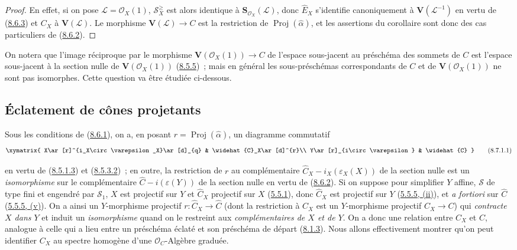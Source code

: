 \begin{proof}
En effet, si on pose $\mathcal{L}=\mathcal{O}_X(1)$,
$\mathcal{S}_X^{\geq}$ est alors identique à
$\mathbf{S}_{\mathcal{O}_X}(\mathcal{L})$, donc $\widehat{E}_X$ s'identifie
canoniquement à $\mathbf{V}(\mathcal{L}^{-1})$ en vertu de
(\hyperref[II.8.6.3-fr]{8.6.3}) et $C_X$ à $\mathbf{V}(\mathcal{L})$. Le
morphisme $\mathbf{V}(\mathcal{L})\to C$ est la restriction de
$\operatorname{Proj}(\widehat{\alpha})$, et les assertions du corollaire sont
donc des cas particuliers de (\hyperref[II.8.6.2-fr]{8.6.2}).
\end{proof}

On notera que l'image réciproque par le morphisme
$\mathbf{V}(\mathcal{O}_X(1))\to C$ de l'espace sous-jacent au préschéma des
sommets de $C$ est l'espace sous-jacent à la section nulle de
$\mathbf{V}(\mathcal{O}_X(1))$ (\hyperref[II.8.5.5-fr]{8.5.5})~; mais en
général les sous-préschémas correspondants de $C$ et de
$\mathbf{V}(\mathcal{O}_X(1))$ ne sont pas isomorphes. Cette question va être
étudiée ci-dessous.

\subsection{Éclatement de cônes projetants}
\label{subsection:II.8.7-fr}

\begin{env}[8.7.1]
\label{II.8.7.1-fr}
Sous les conditions de (\hyperref[II.8.6.1-fr]{8.6.1}), on a, en posant
$r=\operatorname{Proj}(\widehat{\alpha})$, un diagramme commutatif
\begin{equation}
\label{II.8.7.1.1-fr}
  \xymatrix{
    X\ar[r]^{i_X\circ\varepsilon_X}\ar[d]_{q} &
    \widehat{C}_X\ar[d]^{r}\\
    Y\ar[r]_{i\circ\varepsilon} & \widehat{C}
  }
\tag{8.7.1.1}
\end{equation}

en vertu de (\hyperref[II.8.5.1.3-fr]{8.5.1.3}) et
(\hyperref[II.8.5.3.2-fr]{8.5.3.2})~; en outre, la restriction de $r$ au
complémentaire $\widehat{C}_X-i_X(\varepsilon_X(X))$ de la section nulle est
un \emph{isomorphisme} sur le complémentaire
$\widehat{C}-i(\varepsilon(Y))$ de la section nulle en vertu de
(\hyperref[II.8.6.2-fr]{8.6.2}). Si on suppose pour simplifier $Y$ affine,
$\mathcal{S}$ de type fini et engendré par $\mathcal{S}_1$, $X$ est projectif
sur $Y$ et $\widehat{C}_X$ projectif sur $X$
(\hyperref[II.5.5.1-fr]{5.5.1}), donc $\widehat{C}_X$ est projectif sur $Y$
(\hyperref[II.5.5.5-fr]{5.5.5, (ii)}), et \emph{a fortiori} sur
$\widehat{C}$ (\hyperref[II.5.5.5-fr]{5.5.5, (v)}). On a ainsi un
$Y$-morphisme projectif $r:\widehat{C}_X\to\widehat{C}$ (dont la restriction
à $C_X$ est un $Y$-morphisme projectif $C_X\to C$) qui \emph{contracte $X$
dans $Y$} et induit un \emph{isomorphisme} quand on le restreint aux
\emph{complémentaires de $X$ et de $Y$}. On a donc une relation entre $C_X$
et $C$, analogue à celle qui a lieu entre un préschéma éclaté et son préschéma
de départ (\hyperref[II.8.1.3-fr]{8.1.3}). Nous allons effectivement montrer
qu'on peut identifier $C_X$ au spectre homogène d'une
$\mathcal{O}_C$-Algèbre graduée.
\end{env}

